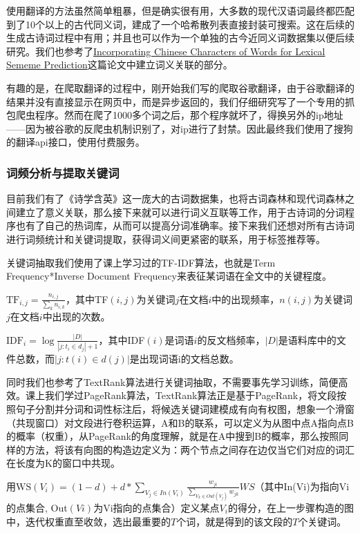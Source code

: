 \documentclass[a4paper, 10pt]{article}
\begin{document}
使用翻译的方法虽然简单粗暴，但是确实很有用，大多数的现代汉语词最终都匹配到了10个以上的古代同义词，建成了一个哈希散列表直接封装可搜索。这在后续的生成古诗词过程中有用；并且也可以作为一个单独的古今近同义词数据集以便后续研究。我们也参考了\href{https://arxiv.org/abs/1806.06349}{Incorporating Chinese Characters of Words for Lexical Sememe Prediction}这篇论文中建立词义关联的部分。

有趣的是，在爬取翻译的过程中，刚开始我们写的爬取谷歌翻译，由于谷歌翻译的结果并没有直接显示在网页中，而是异步返回的，我们仔细研究写了一个专用的抓包爬虫程序。然而在爬了1000多个词之后，那个程序就坏了，得换另外的ip地址——因为被谷歌的反爬虫机制识别了，对ip进行了封禁。因此最终我们使用了搜狗的翻译api接口，使用付费服务。

\subsubsection*{词频分析与提取关键词}
目前我们有了《诗学含英》这一庞大的古词数据集，也将古词森林和现代词森林之间建立了意义关联，那么接下来就可以进行词义互联等工作，用于古诗词的分词程序也有了自己的热词库，从而可以提高分词准确率。接下来我们还想对所有古诗词进行词频统计和关键词提取，获得词义间更紧密的联系，用于标签推荐等。

关键词抽取我们使用了课上学习过的TF-IDF算法，也就是Term Frequency*Inverse Document Frequency来表征某词语在全文中的关键程度。

$\displaystyle \mathrm{TF}_{i,j}=\frac{n_{i,j}}{\sum_k{n_{i,k}}}$，其中TF$(i,j)$为关键词$j$在文档$i$中的出现频率，$n(i,j)$为关键词$j$在文档$i$中出现的次数。

$\displaystyle \mathrm{IDF}_i=\log\frac{|D|}{|j:t_i∈d_j|+1}$，其中IDF$(i)$是词语$i$的反文档频率，$|D|$是语料库中的文件总数，而$|j:t(i)\in d(j)|$是出现词语i的文档总数。

同时我们也参考了TextRank算法进行关键词抽取，不需要事先学习训练，简便高效。课上我们学过PageRank算法，TextRank算法正是基于PageRank，将文段按照句子分割并分词和词性标注后，将候选关键词建模成有向有权图，想象一个滑窗（共现窗口）对文段进行卷积运算，A和B的联系，可以定义为从图中点A指向点B的概率（权重），从PageRank的角度理解，就是在A中搜到B的概率，那么按照同样的方法，将该有向图的构造边定义为：两个节点之间存在边仅当它们对应的词汇在长度为K的窗口中共现。

用$\displaystyle \mathrm{WS}(V_i)=(1-d)+d*\sum_{V_j∈In(V_i)}\frac{w_{ji}}{\sum_{V_k∈Out(V_j)}w_{jk}}WS$（其中In(Vi)为指向Vi的点集合, Out$(Vi)$为Vi指向的点集合）定义某点$V_i$的得分，在上一步骤构造的图中，迭代权重直至收敛，选出最重要的$T$个词，就是得到的该文段的$T$个关键词。
\end{document}
